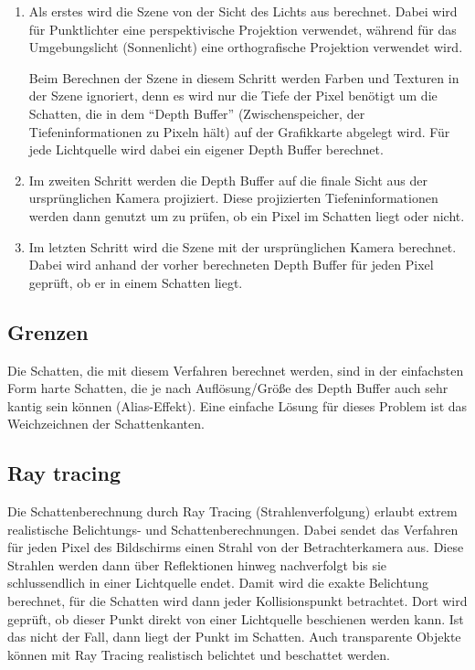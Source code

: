 \begin{enumerate}
 \item Als erstes wird die Szene von der Sicht des Lichts aus berechnet. Dabei wird für Punktlichter
       eine perspektivische Projektion verwendet, während für das Umgebungslicht (Sonnenlicht) eine
       orthografische Projektion verwendet wird.

       Beim Berechnen der Szene in diesem Schritt werden Farben und Texturen in der Szene ignoriert,
       denn es wird nur die Tiefe der Pixel benötigt um die Schatten, die in dem "`Depth Buffer"'
       (Zwischenspeicher, der Tiefeninformationen zu Pixeln hält) auf der Grafikkarte abgelegt wird.
       Für jede Lichtquelle wird dabei ein eigener Depth Buffer berechnet.
 \item Im zweiten Schritt werden die Depth Buffer auf die finale Sicht aus der ursprünglichen Kamera
       projiziert. Diese projizierten Tiefeninformationen werden dann genutzt um zu prüfen, ob ein
       Pixel im Schatten liegt oder nicht.
 \item Im letzten Schritt wird die Szene mit der ursprünglichen Kamera berechnet. Dabei wird anhand
       der vorher berechneten Depth Buffer für jeden Pixel geprüft, ob er in einem Schatten liegt.
\end{enumerate}

\subsection*{Grenzen}

Die Schatten, die mit diesem Verfahren berechnet werden, sind in der einfachsten Form harte Schatten,
die je nach Auflösung/Größe des Depth Buffer auch sehr kantig sein können (Alias-Effekt). Eine
einfache Lösung für dieses Problem ist das Weichzeichnen der Schattenkanten.

\subsection{Ray tracing}

Die Schattenberechnung durch Ray Tracing (Strahlenverfolgung) erlaubt extrem realistische Belichtungs-
und Schattenberechnungen.
Dabei sendet das Verfahren für jeden Pixel des Bildschirms einen Strahl von der Betrachterkamera aus.
Diese Strahlen werden dann über Reflektionen hinweg nachverfolgt bis sie schlussendlich in einer
Lichtquelle endet. Damit wird die exakte Belichtung berechnet, für die Schatten wird dann jeder
Kollisionspunkt betrachtet. Dort wird geprüft, ob dieser Punkt direkt von einer Lichtquelle
beschienen werden kann. Ist das nicht der Fall, dann liegt der Punkt im Schatten. Auch transparente
Objekte können mit Ray Tracing realistisch belichtet und beschattet werden.

